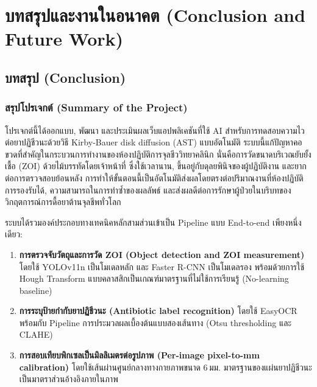 \chapter{บทสรุปและงานในอนาคต (Conclusion and Future Work)}

\section{บทสรุป (Conclusion)}
\label{sec:conclusion}

\subsection{สรุปโปรเจกต์ (Summary of the Project)}

โปรเจกต์นี้ได้ออกแบบ, พัฒนา และประเมินผลเว็บแอปพลิเคชันที่ใช้ AI สำหรับการทดสอบความไวต่อยาปฏิชีวนะด้วยวิธี Kirby-Bauer disk diffusion (AST) แบบอัตโนมัติ ระบบนี้แก้ปัญหาคอขวดที่สำคัญในกระบวนการทำงานของห้องปฏิบัติการจุลชีววิทยาคลินิก นั่นคือการวัดขนาดบริเวณยับยั้งเชื้อ (ZOI) ด้วยไม้บรรทัดโดยเจ้าหน้าที่ ซึ่งใช้เวลานาน, ขึ้นอยู่กับดุลยพินิจของผู้ปฏิบัติงาน และยากต่อการตรวจสอบย้อนหลัง \cite{humphries2018} การทำให้ขั้นตอนนี้เป็นอัตโนมัติส่งผลโดยตรงต่อปริมาณงานที่ห้องปฏิบัติการรองรับได้, ความสามารถในการทำซ้ำของผลลัพธ์ และส่งผลดีต่อการรักษาผู้ป่วยในบริบทของวิกฤตการณ์การดื้อยาต้านจุลชีพทั่วโลก \cite{who_amr2022}

ระบบได้รวมองค์ประกอบทางเทคนิคหลักสามส่วนเข้าเป็น Pipeline แบบ End-to-end เพียงหนึ่งเดียว:

\begin{enumerate}
  \item \textbf{การตรวจจับวัตถุและการวัด ZOI (Object detection and ZOI measurement)} โดยใช้ YOLOv11n เป็นโมเดลหลัก \cite{wang2024yolov11} และ Faster R-CNN เป็นโมเดลรอง \cite{ren2015faster} พร้อมด้วยการใช้ Hough Transform แบบคลาสสิกเป็นเกณฑ์มาตรฐานที่ไม่ใช้การเรียนรู้ (No-learning baseline)
  \item \textbf{การระบุป้ายกำกับยาปฏิชีวนะ (Antibiotic label recognition)} โดยใช้ EasyOCR \cite{baek2019craft} พร้อมกับ Pipeline การประมวลผลเบื้องต้นแบบสองเส้นทาง (Otsu thresholding และ CLAHE)
  \item \textbf{การสอบเทียบพิกเซลเป็นมิลลิเมตรต่อรูปภาพ (Per-image pixel-to-mm calibration)} โดยใช้เส้นผ่านศูนย์กลางทางกายภาพขนาด 6\,มม. มาตรฐานของแผ่นยาปฏิชีวนะเป็นมาตราส่วนอ้างอิงภายในภาพ
\end{enumerate}

